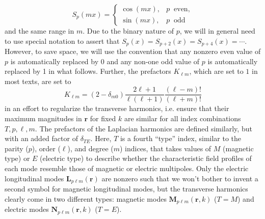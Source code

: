 \begin{equation}
S_p(mx) = 
\begin{cases}
\cos(mx), & p\;\;\mathrm{even},\\
\sin(mx), & p \;\;\mathrm{odd}
\end{cases}
\end{equation}
and the same range in $m$. Due to the binary nature of $p$, we will in general need to use special notation to assert that $S_p(x) = S_{p + 2}(x) = S_{p+4}(x) = \cdots$. However, to save space, we will use the convention that any nonzero even value of $p$ is automatically replaced by 0 and any non-one odd value of $p$ is automatically replaced by 1 in what follows. Further, the prefactors $K_{\ell m}$, which are set to $1$ in most texts, are set to
\begin{equation}
K_{\ell m} = (2 - \delta_{m0})\frac{2\ell + 1}{\ell(\ell + 1)}\frac{(\ell - m)!}{(\ell + m)!}
\end{equation}
in an effort to regularize the transverse harmonics, i.e. ensure that their maximum magnitudes in $\mathbf{r}$ for fixed $k$ are similar for all index combinations $T,p,\ell,m$. The prefactors of the Laplacian harmonics are defined similarly, but with an added factor of $\delta_{TE}$. Here, $T$ is a fourth ``type'' index, similar to the parity ($p$), order ($\ell$), and degree ($m$) indices, that takes values of $M$ (magnetic type) or $E$ (electric type) to describe whether the characteristic field profiles of each mode resemble those of magnetic or electric multipoles. Only the electric longitudinal modes $\mathbf{L}_{p\ell m}(\mathbf{r})$ are nonzero such that we won't bother to invent a second symbol for magnetic longitudinal modes, but the transverse harmonics clearly come in two different types: magnetic modes $\mathbf{M}_{p\ell m}(\mathbf{r},k)$ ($T = M$) and electric modes $\mathbf{N}_{p\ell m}(\mathbf{r},k)$ ($T = E$).

